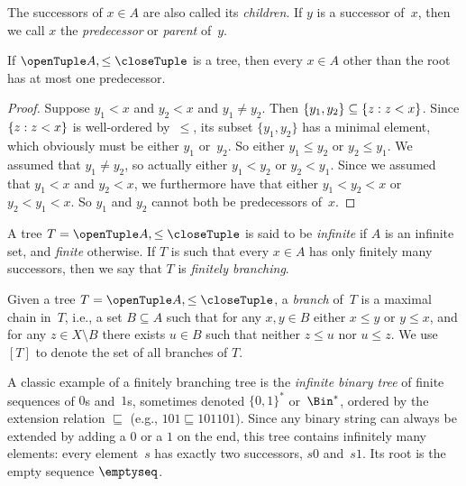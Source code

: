 \documentclass[../../../include/open-logic-section]{subfiles}
\begin{document}
The successors of $x \in A$ are also called its \emph{children}. If
$y$ is a successor of~$x$, then we call $x$ the \emph{predecessor} or
\emph{parent} of~$y$.

\begin{prop}
If $\tuple{A,\le}$ is a tree, then every $x \in A$ other than the root
has at most one predecessor.
\end{prop}

\begin{proof}
  Suppose $y_1 < x$ and $y_2 < x$ and $y_1 \neq y_2$. Then $\{y_1,
  y_2\} \subseteq \{ z : z<x \}$. Since $\{ z : z<x \}$ is
  well-ordered by~$\le$, its subset $\{y_1, y_2\}$ has a minimal
  element, which obviously must be either $y_1$ or~$y_2$. So either
  $y_1 \le y_2$ or $y_2 \le y_1$. We assumed that $y_1 \neq y_2$, so
  actually either $y_1 < y_2$ or $y_2 < y_1$. Since we assumed that
  $y_1 < x$ and $y_2 < x$, we furthermore have that either $y_1 < y_2
  < x$ or $y_2 < y_1 < x$. So $y_1$ and $y_2$ cannot both be
  predecessors of~$x$.
\end{proof}

\begin{defn}
A tree $T = \tuple{A, \le}$ is said to be \emph{infinite} if $A$ is an
infinite set, and \emph{finite} otherwise. If $T$ is such that every
$x \in A$ has only finitely many successors, then we say that $T$ is
\emph{finitely branching}.
\end{defn}

\begin{defn}[Branches]
Given a tree $T = \tuple{A, \le}$, a \emph{branch} of~$T$ is a
maximal chain in~$T$, i.e., a set $B \subseteq A$ such that
for any $x, y \in B$ either $x \le y$ or $y \le x$, and for any
$z \in X \setminus B$ there exists $u \in B$ such that neither
$z \le u$ nor $u \le z$.
%
We use $[T]$ to denote the set of all branches of $T$.
\end{defn}

\begin{ex}
A classic example of a finitely branching tree is the
\emph{infinite binary tree} of finite sequences of $0$s and~$1$s,
sometimes denoted $\{0,1\}^*$ or~$\Bin^*$, ordered by the extension
relation $\sqsubseteq$ (e.g., $101 \sqsubseteq 101101$).
Since any binary string can always be extended by adding
a $0$ or a $1$ on the end, this tree contains infinitely
many elements: every element~$s$ has exactly two successors, $s0$ and~$s1$. Its root is the empty sequence $\emptyseq$.
\end{ex}
\end{document}
